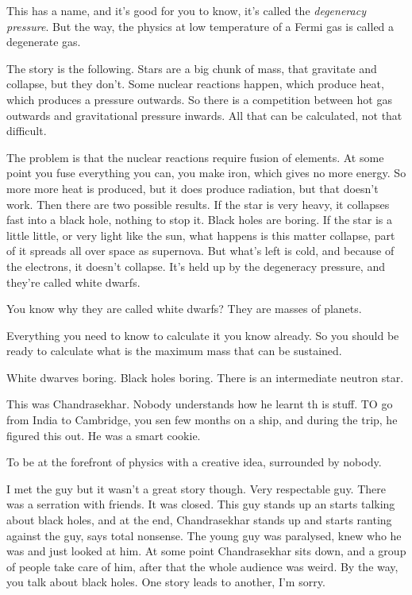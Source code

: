 This has a name,
and it's good for you to know,
it's called the
\emph{degeneracy pressure}.
But the way,
the physics at low temperature of a Fermi gas
is called a degenerate gas.

The story is the following.
Stars are a big chunk of mass,
that gravitate and collapse,
but they don't.
Some nuclear reactions happen,
which produce heat,
which produces a pressure outwards.
So there is a competition between hot gas outwards and gravitational pressure
inwards.
All that can be calculated,
not that difficult.

The problem is that the nuclear reactions require fusion of elements.
At some point you fuse everything you can,
you make iron,
which gives no more energy.
So more more heat is produced,
but it does produce radiation,
but that doesn't work.
Then there are two possible results.
If the star is very heavy,
it collapses fast into a black hole,
nothing to stop it.
Black holes are boring.
If the star is a little little,
or very light like the sun,
what happens is this matter collapse,
part of it spreads all over space as supernova.
But what's left is cold,
and because of the electrons,
it doesn't collapse.
It's held up by the degeneracy pressure,
and they're called white dwarfs.

You know why they are called white dwarfs?
They are masses of planets.

Everything you need to know to calculate it you know already.
So you should be ready to calculate what is the maximum mass that can be
sustained.

White dwarves boring.
Black holes boring.
There is an intermediate neutron star.


This was Chandrasekhar.
Nobody understands how he learnt th is stuff.
TO go from India to Cambridge,
you sen  few months on a ship,
and during the trip,
he figured this out.
He was a smart cookie.

To be at the forefront of physics with a creative idea,
surrounded by nobody.

I met the guy but it wasn't a great story though.
Very respectable guy.
There was a serration with friends.
It was closed.
This guy stands up an starts talking about black holes,
and at the end,
Chandrasekhar stands up and starts ranting against the guy,
says total nonsense.
The young guy was paralysed,
knew who he was and just looked at him.
At some point Chandrasekhar sits down,
and a group of people take care of him,
after that the whole audience was weird.
By the way,
you talk about black holes.
One story leads to another,
I'm sorry.

